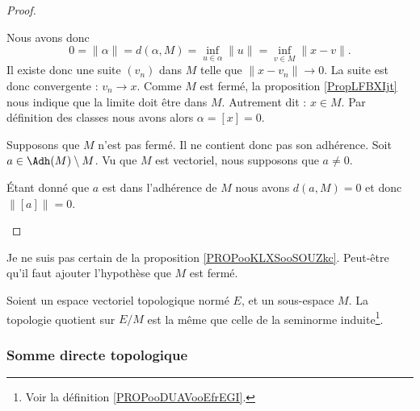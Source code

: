 \begin{proof}
\begin{subproof}
        Nous avons donc
        \begin{equation}
            0=\| \alpha \|=d(\alpha,M)=\inf_{u\in \alpha}\| u \|=\inf_{v\in M}\| x-v \|.
        \end{equation}
        Il existe donc une suite \( (v_n)\) dans \( M\) telle que \( \| x-v_n \|\to 0\). La suite est donc convergente : \( v_n\to x\). Comme \( M\) est fermé, la proposition \ref{PropLFBXIjt} nous indique que la limite doit être dans \( M\). Autrement dit : \( x\in M\). Par définition des classes nous avons alors \( \alpha=[x]=0\).

        Supposons que \( M\) n'est pas fermé. Il ne contient donc pas son adhérence. Soit \( a\in \Adh(M)\setminus M\). Vu que \( M\) est vectoriel, nous supposons que \( a\neq 0\).

        Étant donné que \( a\) est dans l'adhérence de \( M\) nous avons \( d(a,M)=0\) et donc \( \| [a] \|=0\).
    \end{subproof}
\end{proof}


\begin{probleme}
    Je ne suis pas certain de la proposition \ref{PROPooKLXSooSOUZkc}. Peut-être qu'il faut ajouter l'hypothèse que \( M\) est fermé.
\end{probleme}

\begin{proposition}     \label{PROPooKLXSooSOUZkc}
    Soient un espace vectoriel topologique normé \( E\), et un sous-espace \( M\). La topologie quotient sur \( E/M\) est la même que celle de la seminorme induite\footnote{Voir la définition \ref{PROPooDUAVooEfrEGI}.}.
\end{proposition}

\subsubsection{Somme directe topologique}

